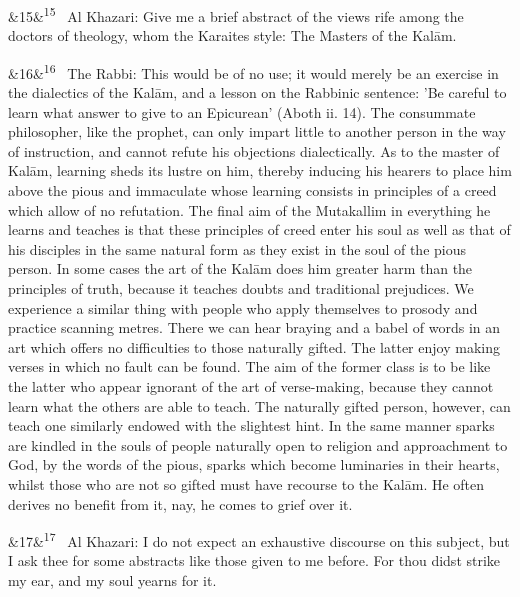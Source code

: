\documentclass[12pt]{article}
\newcommand{\para}[1][]{\par\noindent\ifx&#1&\else\textsuperscript{\footnotesize #1}~\fi}
\begin{document}
\para[15] Al Khazari: Give me a brief abstract of the views rife among the doctors of theology, whom the Karaites style: The Masters of the Kalām.

\para[16] The Rabbi: This would be of no use; it would merely be an exercise in the dialectics of the Kalām, and a lesson on the Rabbinic sentence: 'Be careful to learn what answer to give to an Epicurean' (Aboth ii. 14). The consummate philosopher, like the prophet, can only impart little to another person in the way of instruction, and cannot refute his objections dialectically. As to the master of Kalām, learning sheds its lustre on him, thereby inducing his hearers to place him above the pious and immaculate whose learning consists in principles of a creed which allow of no refutation. The final aim of the Mutakallim in everything he learns and teaches is that these principles of creed enter his soul as well as that of his disciples in the same natural form as they exist in the soul of the pious person. In some cases the art of the Kalām does him greater harm than the principles of truth, because it teaches doubts and traditional prejudices. We experience a similar thing with people who apply themselves to prosody and practice scanning metres. There we can hear braying and a babel of words in an art which offers no difficulties to those naturally gifted. The latter enjoy making verses in which no fault can be found. The aim of the former class is to be like the latter who appear ignorant of the art of verse-making, because they cannot learn what the others are able to teach. The naturally gifted person, however, can teach one similarly endowed with the slightest hint. In the same manner sparks are kindled in the souls of people naturally open to religion and approachment to God, by the words of the pious, sparks which become luminaries in their hearts, whilst those who are not so gifted must have recourse to the Kalām. He often derives no benefit from it, nay, he comes to grief over it.

\para[17] Al Khazari: I do not expect an exhaustive discourse on this subject, but I ask thee for some abstracts like those given to me before. For thou didst strike my ear, and my soul yearns for it.
\end{document}
